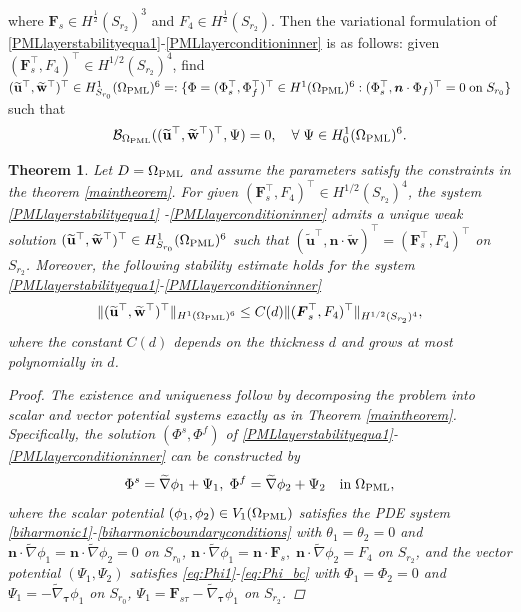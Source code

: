 \documentclass[11pt]{article}
\newcommand{\Om}{\Omega}
\newcommand{\wid}{\widetilde}
\newcommand{\bs}{\boldsymbol}
\newcommand{\PML}{{\rm PML}}
\newtheorem{theorem}{Theorem}[section]
\begin{document}
where  $\bs{F}_s\in H^{\frac{1}{2}}(S_{r_2})^3$ and $F_4\in H^{\frac{1}{2}}(S_{r_2})$.
Then the variational formulation of \eqref{PMLlayerstabilityequa1}-\eqref{PMLlayerconditioninner} 
is as follows: given $(\bs{F}_s^{\top},F_4)^{\top}\in H^{1/2}(S_{r_2})^4$, find $	(\wid{\mathbf{u}}^{\top},
\wid{\mathbf{w}}^{\top})^{\top} \in 
H_{S_{r_0}}^1(\Om_{\PML})^6=:\{\Phi=(\Phi_s^{\top},\Phi_f^{\top})^{\top}\in H^1(\Om_{\PML})^6: (\Phi_s^{\top},
\bs{n}\cdot \Phi_f)^{\top}=0\;{\rm on}\;S_{r_0}\}$ such that
\begin{equation}\label{varform_BPML}
\mathcal{B}_{\Om_\PML}((\wid{\mathbf{u}}^{\top},	 \wid{\mathbf{w}}^{\top})^{\top} ,\Psi)=0, \quad\forall\;
\Psi\in H_0^1(\Om_{\PML})^6.
\end{equation}

\begin{theorem}\label{pmllayer}
Let $D=\Om_{\PML}$ and assume the parameters satisfy the constraints in the theorem \ref{maintheorem}. 
For given $(\bs{F}_s^{\top},F_4)^{\top}\in H^{1/2}(S_{r_2})^4$, the system \eqref{PMLlayerstabilityequa1}
-\eqref{PMLlayerconditioninner}
admits a unique weak solution $(\wid{\mathbf{u}}^{\top}, \wid{\mathbf{w}}^{\top})^{\top}\in H^{1}_{S_{r_0}}
(\Om_{\PML})^6$ such that $(\wid{\mathbf{u}}^{\top},\bs{n}\cdot\wid{\mathbf{w}})^{\top}
=(\bs{F}_s^{\top},F_4)^{\top}$ on $S_{r_2}$. Moreover, the following stability estimate holds for the system 
\eqref {PMLlayerstabilityequa1}-\eqref {PMLlayerconditioninner}
\begin{equation}\label{stability_pmllayer}
\Vert (\wid{\mathbf{u}}^{\top},	 \wid{\mathbf{w}}^{\top})^{\top} \Vert_{H^1(\Om_{\PML})^6}
\leq C(d)\Vert (\bs{F}_s^{\top},F_4)^{\top} \Vert_{H^{1/2}(S_{r_2})^4},
\end{equation}
where the constant $C(d)$ depends on the thickness $d$ and grows at most polynomially in $d$.
\begin{proof}
The existence and uniqueness follow by decomposing the problem into scalar and vector potential 
systems exactly as in Theorem \ref{maintheorem}. Specifically, the solution $(\Phi^s,\Phi^f)$ of 
\eqref{PMLlayerstabilityequa1}-\eqref{PMLlayerconditioninner} can be constructed by
\begin{equation}
\Phi^s= \wid{\nabla}\phi_1 +\Psi_1,\;\Phi^f= \wid{\nabla}\phi_2 +\Psi_2\quad{\rm in}\;\Om_{\PML},
\end{equation}
where the scalar potential $(\phi_1,\phi_2)\in V_1(\Om_{\PML})$ satisfies the PDE system 
\eqref{biharmonic1}-\eqref{biharmonicboundaryconditions}
with $\theta_1=\theta_2=0$ and $\bs{n}\cdot \wid{\nabla}\phi_1=\bs{n}\cdot\wid{\nabla}\phi_2=0$ on $S_{r_0}$,
$\bs{n}\cdot \wid{\nabla}\phi_1=\bs{n}\cdot\bs{F}_s,\;\bs{n}\cdot\wid{\nabla}\phi_2=F_4$ on $S_{r_2}$, 
and the vector potential $(\Psi_1,\Psi_2)$ satisfies \eqref{eq:Phi1}-\eqref{eq:Phi_bc} with $\Phi_1=\Phi_2=0$ 
and $\Psi_1=-\wid{\nabla}_{\bs{\tau}}\phi_1$ on $S_{r_0}$,
$\Psi_1=\bs{F}_{s\tau}-\wid{\nabla}_{\bs{\tau}}\phi_1$ on $S_{r_2}$. 


\end{proof}
\end{theorem}
\end{document}

